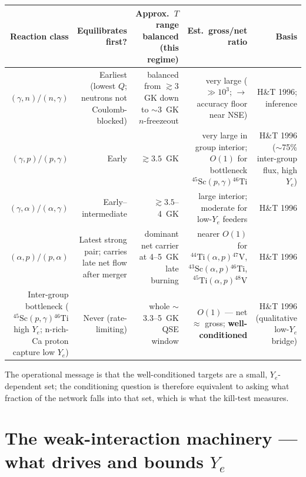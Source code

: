 \documentclass[11pt]{article}
\newcommand{\nuc}[2]{\ensuremath{{}^{#2}\mathrm{#1}}}
\begin{document}
\begin{center}
\footnotesize
\setlength{\tabcolsep}{4pt}
\renewcommand{\arraystretch}{1.25}
\begin{tabularx}{\textwidth}{@{}R{0.82}R{0.88}R{1.35}R{1.1}R{0.85}@{}}
\toprule
\textbf{Reaction class} & \textbf{Equilibrates first?} & \textbf{Approx.\ $T$ range balanced (this regime)} & \textbf{Est.\ gross/net ratio} & \textbf{Basis} \\
\midrule
$(\gamma,n)/(n,\gamma)$ & Earliest (lowest $Q$; neutrons not Coulomb-blocked) & balanced from $\gtrsim 3$~GK down to $\sim 3$~GK $n$-freezeout & very large ($\gg 10^3$; $\to$ accuracy floor near NSE) & H\&T 1996; inference \\
$(\gamma,p)/(p,\gamma)$ & Early & $\gtrsim 3.5$~GK & very large in group interior; $O(1)$ for bottleneck $\nuc{Sc}{45}(p,\gamma)\nuc{Ti}{46}$ & H\&T 1996 ($\sim$75\% inter-group flux, high $Y_e$) \\
$(\gamma,\alpha)/(\alpha,\gamma)$ & Early--intermediate & $\gtrsim 3.5$--4~GK & large interior; moderate for low-$Y_e$ feeders & H\&T 1996 \\
$(\alpha,p)/(p,\alpha)$ & Latest strong pair; carries late net flow after merger & dominant net carrier at 4--5~GK late burning & nearer $O(1)$ for $\nuc{Ti}{44}(\alpha,p)\nuc{V}{47}$, $\nuc{Sc}{43}(\alpha,p)\nuc{Ti}{46}$, $\nuc{Ti}{45}(\alpha,p)\nuc{V}{48}$ & H\&T 1996 \\
Inter-group bottleneck ($\nuc{Sc}{45}(p,\gamma)\nuc{Ti}{46}$ high $Y_e$; n-rich-Ca proton capture low $Y_e$) & Never (rate-limiting) & whole $\sim$3.3--5~GK QSE window & $O(1)$ --- net $\approx$ gross; \textbf{well-conditioned} & H\&T 1996 (qualitative low-$Y_e$ bridge) \\
\bottomrule
\end{tabularx}
\end{center}

\noindent The operational message is that the well-conditioned targets are a small, $Y_e$-dependent set; the conditioning question is therefore equivalent to asking what fraction of the network falls into that set, which is what the kill-test measures.

\section{The weak-interaction machinery --- what drives and bounds \texorpdfstring{$Y_e$}{Ye}}
\end{document}
